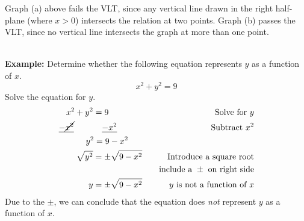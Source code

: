 \documentclass[12pt]{article}
\theoremstyle{definition}
\begin{document}
\begin{center}
\begin{multicols}{2}

\columnbreak

\end{multicols}
\end{center}
Graph (a) above fails the VLT, since any vertical line drawn in the right half-plane (where $x>0$) intersects the relation at two points.  Graph (b) passes the VLT, since no vertical line intersects the graph at more than one point.\\
\ \par
{\bf Example:} Determine whether the following equation represents $y$ as a function of $x$.
$$x^2+y^2=9$$
Solve the equation for $y$.
  \begin{eqnarray*}
    x^2+y^2=9~~~~~~~~~~~~  & & \text{Solve~for~} y\\
    \underline{-\cancel{x^2}}~~~~~~~~~~\underline{-x^2}~~~~~~~~~  & & \text{Subtract~} x^2\\
    y^2=9-x^2~~~~~  & & \\
	  \sqrt{y^2}=\pm\sqrt{9-x^2}  & & \text{Introduce~a~square~root}\\
		& & \text{~~~include a~} \pm \text{~on~right~side}\\
	  y=\pm\sqrt{9-x^2}  & & y \text{~is~not~a~function~of~}x
	\end{eqnarray*}
Due to the $\pm$, we can conclude that the equation does \textit{not} represent $y$ as a function of $x$.
\newpage
\end{document}
